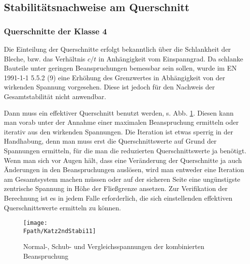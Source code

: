 \vspace{-1cm}
{\textcolor{sectionTitleBlue}{\subsection{Stabilit\"{a}tsnachweise am Querschnitt }}}
\vspace{-0.5cm}
{\textcolor{sectionTitleBlue}{\subsubsection*{Querschnitte der Klasse 4 }}}
Die Einteilung der Querschnitte erfolgt bekanntlich \"{u}ber die Schlankheit der Bleche, bzw. das Verh\"{a}ltnis $c/t$ in Anh\"{a}ngigkeit vom Einspanngrad. Da schlanke Bauteile unter geringen Beanspruchungen bemessbar sein sollen, wurde im EN 1991-1-1 5.5.2 (9) eine Erh\"{o}hung des Grenzwertes in Abh\"{a}ngigkeit von der wirkenden Spannung vorgesehen. Diese ist jedoch f\"{u}r den Nachweis der Gesamtstabilit\"{a}t nicht anwendbar.

Dann muss ein effektiver Querschnitt benutzt werden, s. Abb. \ref{Katz2ndStabi11}. Diesen kann man vorab unter der Annahme einer maximalen Beanspruchung ermitteln oder iterativ aus den wirkenden Spannungen. Die Iteration ist etwas sperrig in der Handhabung, denn man muss erst die Querschnittswerte auf Grund der Spannungen ermitteln, f\"{u}r die man die reduzierten Querschnittswerte ja ben\"{o}tigt. Wenn man sich vor Augen h\"{a}lt, dass eine Ver\"{a}nderung der Querschnitte ja auch \"{A}nderungen in den Beanspruchungen ausl\"{o}sen, wird man entweder eine Iteration am Gesamtsystem machen m\"{u}ssen oder auf der sicheren Seite eine ung\"{u}nstigste zentrische Spannung in H\"{o}he der Flie{\ss}grenze ansetzen. Zur Verifikation der Berechnung ist es in jedem Falle erforderlich, die sich einstellenden effektiven Querschnittswerte ermitteln zu k\"{o}nnen.

\begin{figure}[tbp] \centering
\centering
\if {} \sidecaption[t] \fi
\texttt{[image: \\Fpath/Katz2ndStabi11]}
\caption{ Normal-, Schub- und Vergleichsspannungen der kombinierten Beanspruchung
} \label{Katz2ndStabi11}
\end{figure}%

